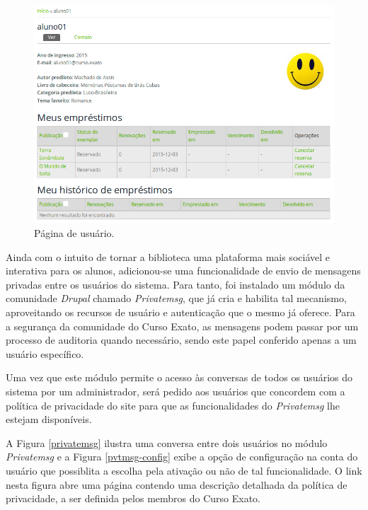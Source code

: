 \documentclass[a4paper]{article}
\begin{document}
\begin{figure}[pbth!]
\centering
\includegraphics[width=140mm]{img/userpage.png}
\caption{Página de usuário.\label{userpage}}
\end{figure}

Ainda com o intuito de tornar a biblioteca uma plataforma mais sociável e interativa para os alunos, adicionou-se uma funcionalidade de envio de mensagens privadas entre os usuários do sistema. Para tanto, foi instalado um módulo da comunidade \textit{Drupal} chamado \textit{Privatemsg}, que já cria e habilita tal mecanismo, aproveitando os recursos de usuário e autenticação que o mesmo já oferece. Para a segurança da comunidade do Curso Exato, as mensagens podem passar por um processo de auditoria quando necessário, sendo este papel conferido apenas a um usuário específico.

Uma vez que este módulo permite o acesso às conversas de todos os usuários do sistema por um administrador, será pedido aos usuários que concordem com a política de privacidade do site para que as funcionalidades do \textit{Privatemsg} lhe estejam disponíveis.

A Figura \ref{privatemsg} ilustra uma conversa entre dois usuários no módulo \textit{Privatemsg} e a Figura \ref{pvtmsg-config} exibe a opção de configuração na conta do usuário que possiblita a escolha pela ativação ou não de tal funcionalidade. O link nesta figura abre uma página contendo uma descrição detalhada da política de privacidade, a ser definida pelos membros do Curso Exato.
\end{document}
